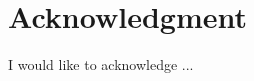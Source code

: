 
\chapter*{\centering Acknowledgment}

\vspace*{4\baselineskip}

\begin{large}
I would like to acknowledge ...
\end{large}
	




 
